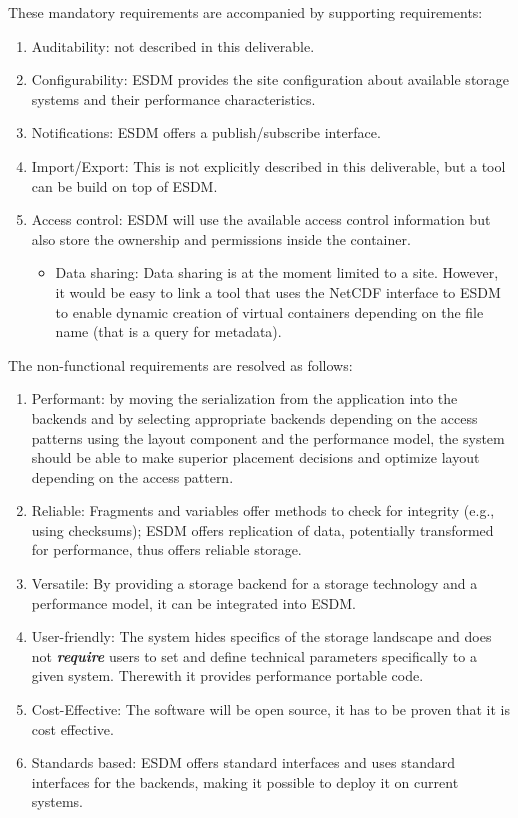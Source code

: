 These mandatory requirements are accompanied by supporting requirements:
\begin{enumerate}
\item Auditability: not described in this deliverable.
\item Configurability: ESDM provides the site configuration about available storage systems and their performance characteristics.
\item Notifications: ESDM offers a publish/subscribe interface.
\item Import/Export: This is not explicitly described in this deliverable, but a tool can be build on top of ESDM.
\item Access control: ESDM will use the available access control information but also store the ownership and permissions inside the container.
\begin{itemize}
\item Data sharing: Data sharing is at the moment limited to a site.
However, it would be easy to link a tool that uses the NetCDF interface to ESDM to enable dynamic creation of virtual containers depending on the file name (that is a query for metadata).
\end{itemize}
\end{enumerate}

The non-functional requirements are resolved as follows:
\begin{enumerate}
\item Performant: by moving the serialization from the application into the backends and by selecting appropriate backends depending on the access patterns using the layout component and the performance model, the system should be able to make superior placement decisions and optimize layout depending on the access pattern.
\item Reliable: Fragments and variables offer methods to check for integrity (e.g., using checksums); ESDM offers replication of data, potentially transformed for performance, thus offers reliable storage.

\item Versatile: By providing a storage backend for a storage technology and a performance model, it can be integrated into ESDM.
\item User-friendly: The system hides specifics of the storage landscape and does not \textit{\textbf{require}} users to set and define technical parameters specifically to a given system.
Therewith it provides performance portable code.
\item Cost-Effective: The software will be open source, it has to be proven that it is cost effective.
\item Standards based: ESDM offers standard interfaces and uses standard interfaces for the backends, making it possible to deploy it on current systems.
\end{enumerate}

